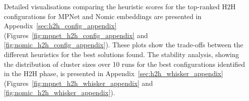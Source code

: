 \documentclass[10pt,oneside]{report}
\begin{document}

Detailed visualisations comparing the heuristic scores for the top-ranked H2H configurations for MPNet and Nomic embeddings are presented in Appendix~\ref{sec:h2h_config_appendix} (Figures~\ref{fig:mpnet_h2h_config_appendix} and \ref{fig:nomic_h2h_config_appendix}). These plots show the trade-offs between the different heuristics for the best solutions found.
The stability analysis, showing the distribution of cluster sizes over 10 runs for the best configurations identified in the H2H phase, is presented in Appendix~\ref{sec:h2h_whisker_appendix} (Figures~\ref{fig:mpnet_h2h_whisker_appendix} and \ref{fig:nomic_h2h_whisker_appendix}).

\end{document}
